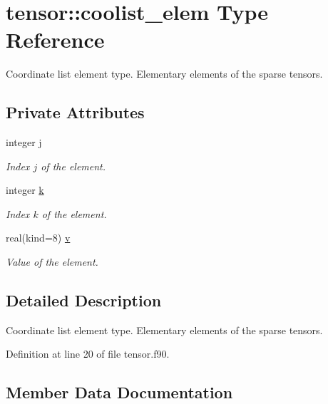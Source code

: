 \hypertarget{structtensor_1_1coolist__elem}{}\section{tensor\+:\+:coolist\+\_\+elem Type Reference}
\label{structtensor_1_1coolist__elem}


Coordinate list element type. Elementary elements of the sparse tensors.  


\subsection*{Private Attributes}
\begin{DoxyCompactItemize}
\item 
integer \hyperlink{structtensor_1_1coolist__elem_a0ed51fd9ddc1c2168d8c138eb5da5f66}{j}
\begin{DoxyCompactList}\small\item\em Index $j$ of the element. \end{DoxyCompactList}\item 
integer \hyperlink{structtensor_1_1coolist__elem_a368c80ca537d7c5d6e1fbba8a85dec38}{k}
\begin{DoxyCompactList}\small\item\em Index $k$ of the element. \end{DoxyCompactList}\item 
real(kind=8) \hyperlink{structtensor_1_1coolist__elem_ac569057f08f5f8ea171b87aa7b9dd428}{v}
\begin{DoxyCompactList}\small\item\em Value of the element. \end{DoxyCompactList}\end{DoxyCompactItemize}


\subsection{Detailed Description}
Coordinate list element type. Elementary elements of the sparse tensors. 

Definition at line 20 of file tensor.\+f90.



\subsection{Member Data Documentation}

